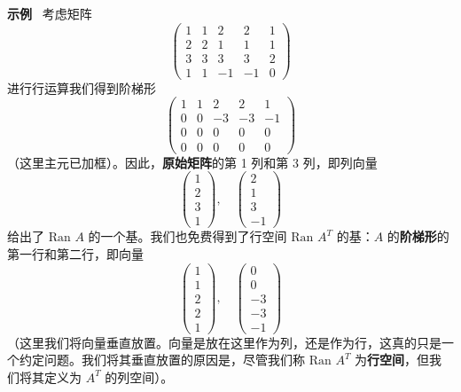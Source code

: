 \textbf{示例}~ 考虑矩阵
$$
\begin{pmatrix}
1 & 1 & 2 & 2 & 1 \\
2 & 2 & 1 & 1 & 1 \\
3 & 3 & 3 & 3 & 2 \\
1 & 1 & -1 & -1 & 0
\end{pmatrix}
$$
进行行运算我们得到阶梯形
$$
\begin{pmatrix}
1 & 1 & 2 & 2 & 1 \\
0 & 0 & -3 & -3 & -1 \\
0 & 0 & 0 & 0 & 0 \\
0 & 0 & 0 & 0 & 0
\end{pmatrix}
$$
（这里主元已加框）。因此，\textbf{原始矩阵}的第 1 列和第 3 列，即列向量
$$
\begin{pmatrix} 1 \\ 2 \\ 3 \\ 1 \end{pmatrix}, \quad \begin{pmatrix} 2 \\ 1 \\ 3 \\ -1 \end{pmatrix}
$$
给出了 $\text{Ran } A$ 的一个基。我们也免费得到了行空间 $\text{Ran } A^T$ 的基：$A$ 的\textbf{阶梯形}的第一行和第二行，即向量
$$
\begin{pmatrix} 1 \\ 1 \\ 2 \\ 2 \\ 1 \end{pmatrix}, \quad \begin{pmatrix} 0 \\ 0 \\ -3 \\ -3 \\ -1 \end{pmatrix}
$$
（这里我们将向量垂直放置。向量是放在这里作为列，还是作为行，这真的只是一个约定问题。我们将其垂直放置的原因是，尽管我们称 $\text{Ran } A^T$ 为\textbf{行空间}，但我们将其定义为 $A^T$ 的列空间）。

